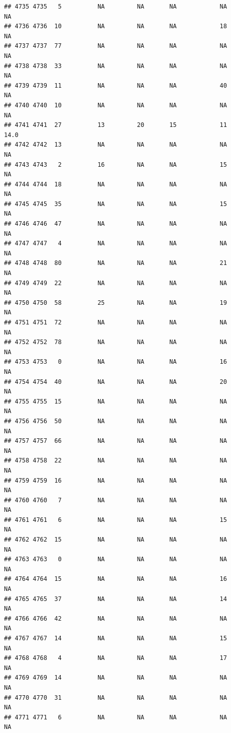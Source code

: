 \documentclass[man]{apa6}
\begin{document}
\begin{verbatim}
## 4735 4735   5          NA         NA       NA            NA       NA
## 4736 4736  10          NA         NA       NA            18       NA
## 4737 4737  77          NA         NA       NA            NA       NA
## 4738 4738  33          NA         NA       NA            NA       NA
## 4739 4739  11          NA         NA       NA            40       NA
## 4740 4740  10          NA         NA       NA            NA       NA
## 4741 4741  27          13         20       15            11     14.0
## 4742 4742  13          NA         NA       NA            NA       NA
## 4743 4743   2          16         NA       NA            15       NA
## 4744 4744  18          NA         NA       NA            NA       NA
## 4745 4745  35          NA         NA       NA            15       NA
## 4746 4746  47          NA         NA       NA            NA       NA
## 4747 4747   4          NA         NA       NA            NA       NA
## 4748 4748  80          NA         NA       NA            21       NA
## 4749 4749  22          NA         NA       NA            NA       NA
## 4750 4750  58          25         NA       NA            19       NA
## 4751 4751  72          NA         NA       NA            NA       NA
## 4752 4752  78          NA         NA       NA            NA       NA
## 4753 4753   0          NA         NA       NA            16       NA
## 4754 4754  40          NA         NA       NA            20       NA
## 4755 4755  15          NA         NA       NA            NA       NA
## 4756 4756  50          NA         NA       NA            NA       NA
## 4757 4757  66          NA         NA       NA            NA       NA
## 4758 4758  22          NA         NA       NA            NA       NA
## 4759 4759  16          NA         NA       NA            NA       NA
## 4760 4760   7          NA         NA       NA            NA       NA
## 4761 4761   6          NA         NA       NA            15       NA
## 4762 4762  15          NA         NA       NA            NA       NA
## 4763 4763   0          NA         NA       NA            NA       NA
## 4764 4764  15          NA         NA       NA            16       NA
## 4765 4765  37          NA         NA       NA            14       NA
## 4766 4766  42          NA         NA       NA            NA       NA
## 4767 4767  14          NA         NA       NA            15       NA
## 4768 4768   4          NA         NA       NA            17       NA
## 4769 4769  14          NA         NA       NA            NA       NA
## 4770 4770  31          NA         NA       NA            NA       NA
## 4771 4771   6          NA         NA       NA            NA       NA

\end{verbatim}
\end{document}
